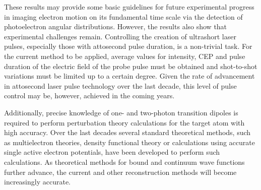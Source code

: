 These results may provide some basic guidelines for future experimental progress in imaging electron motion on its fundamental time scale via the detection of photoelectron angular distributions. However, the results also show that experimental challenges remain. Controlling the creation of ultrashort laser pulses, especially those with attosecond pulse duration, is a non-trivial task. For the current method to be applied, average values for intensity, CEP and pulse duration of the electric field of the probe pulse must be obtained and shot-to-shot variations must be limited up to a certain degree. Given the rate of advancement in attosecond laser pulse technology over the last decade, this level of pulse control may be, however, achieved in the coming years.


Additionally, precise knowledge of one- and two-photon transition dipoles is required to perform perturbation theory calculations for the target atom with high accuracy. Over the last decades several standard theoretical methods, such as multielectron theories, density functional theory or calculations using accurate single active electron potentials, have been developed to perform such calculations. As theoretical methods for bound and continuum wave functions further advance, the current and other reconstruction methods will become increasingly accurate.

